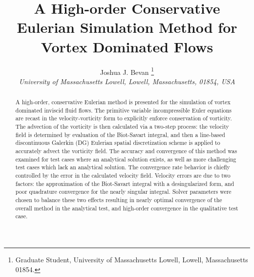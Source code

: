 \documentclass[]{aiaa-tc}%
\title{A High-order Conservative Eulerian Simulation Method for Vortex Dominated Flows}
\author{
 Joshua J. Bevan%
    \thanks{Graduate Student, University of Massachusetts Lowell, Lowell, Massachusetts 01854.}\\
  {\normalsize\itshape
   University of Massachusetts Lowell, Lowell, Massachusetts, 01854, USA}\\
 }
\begin{document}
\maketitle

\begin{abstract}
A high-order, conservative Eulerian method is presented for the simulation of vortex dominated inviscid fluid flows. The primitive variable incompressible Euler equations are recast in the velocity-vorticity form to explicitly enforce conservation of vorticity. The advection of the vorticity is then calculated via a two-step process: the velocity field is determined by evaluation of the Biot-Savart integral, and then a line-based discontinuous Galerkin (DG) Eulerian spatial discretization scheme is applied to accurately advect the vorticity field. The accuracy and convergence of this method was examined for test cases where an analytical solution exists, as well as more challenging test cases which lack an analytical solution. The convergence rate behavior is chiefly controlled by the error in the calculated velocity field. Velocity errors are due to two factors: the approximation of the Biot-Savart integral with a desingularized form, and poor quadrature convergence for the nearly singular integral. Solver parameters were chosen to balance these two effects resulting in nearly optimal convergence of the overall method in the analytical test, and high-order convergence in the qualitative test case.
\end{abstract}


\end{document}
